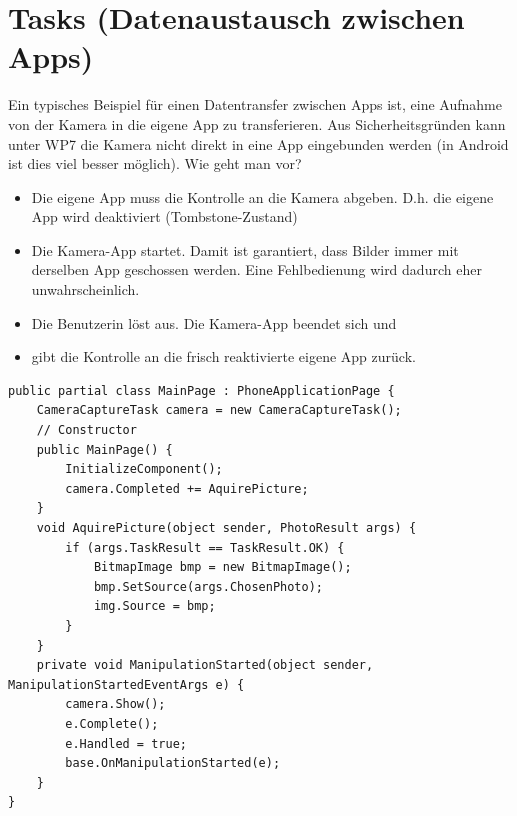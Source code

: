 \documentclass[a4paper,10pt]{scrreprt}
\begin{document}
\chapter{Tasks (Datenaustausch zwischen Apps)}
Ein typisches Beispiel für einen Datentransfer zwischen Apps ist, eine Aufnahme von der Kamera in die eigene
App zu transferieren. Aus Sicherheitsgründen kann unter WP7 die Kamera nicht direkt in eine App eingebunden
werden (in Android ist dies viel besser möglich). Wie geht man vor?
\begin{itemize}
\item Die eigene App muss die Kontrolle an die Kamera abgeben. D.h. die eigene App wird deaktiviert
(Tombstone-Zustand)
\item Die Kamera-App startet. Damit ist garantiert, dass Bilder immer mit derselben App geschossen werden.
Eine Fehlbedienung wird dadurch eher unwahrscheinlich.
\item Die Benutzerin löst aus. Die Kamera-App beendet sich und
\item gibt die Kontrolle an die frisch reaktivierte eigene App zurück.
\end{itemize}
\begin{lstlisting}[caption=Kamera Beispiel]
public partial class MainPage : PhoneApplicationPage {
	CameraCaptureTask camera = new CameraCaptureTask();
	// Constructor
	public MainPage() {
		InitializeComponent();
		camera.Completed += AquirePicture;
	}
	void AquirePicture(object sender, PhotoResult args) {
		if (args.TaskResult == TaskResult.OK) {
			BitmapImage bmp = new BitmapImage();
			bmp.SetSource(args.ChosenPhoto);
			img.Source = bmp;
		}
	}
	private void ManipulationStarted(object sender, ManipulationStartedEventArgs e) {
		camera.Show();
		e.Complete();
		e.Handled = true;
		base.OnManipulationStarted(e);
	}
}
\end{lstlisting}
\end{document}
